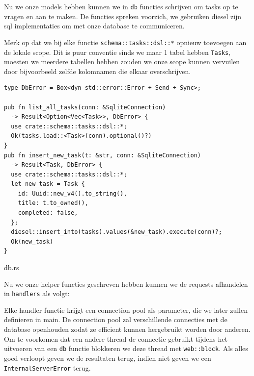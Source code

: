 Nu we onze models hebben kunnen we in \texttt{db} functies schrijven om tasks op te vragen
en aan te maken. De functies spreken voorzich, we gebruiken diesel zijn sql implementaties om met
onze database te communiceren.

Merk op dat we bij elke functie \texttt{schema::tasks::dsl::*} opnieuw toevoegen aan de
lokale scope. Dit is puur conventie sinds we maar 1 tabel hebben \texttt{Tasks}, moesten
we meerdere tabellen hebben zouden we onze scope kunnen vervuilen door bijvoorbeeld zelfde
kolomnamen die elkaar overschrijven.

\begin{listing}[h]
\begin{verbatim}
type DbError = Box<dyn std::error::Error + Send + Sync>;

pub fn list_all_tasks(conn: &SqliteConnection) 
  -> Result<Option<Vec<Task>>, DbError> {
  use crate::schema::tasks::dsl::*;
  Ok(tasks.load::<Task>(conn).optional()?)
}
pub fn insert_new_task(t: &str, conn: &SqliteConnection) 
  -> Result<Task, DbError> {
  use crate::schema::tasks::dsl::*;
  let new_task = Task {
    id: Uuid::new_v4().to_string(),
    title: t.to_owned(),
    completed: false,
  };
  diesel::insert_into(tasks).values(&new_task).execute(conn)?;
  Ok(new_task)
}
\end{verbatim}
\caption{db.rs}
\end{listing}

\clearpage

Nu we onze helper functies geschreven hebben kunnen we de requests afhandelen in
\texttt{handlers} als volgt:

Elke handler functie krijgt een connection pool als parameter, die we later zullen definieren in
main. De connection pool zal verschillende connecties met de database openhouden zodat ze efficient
kunnen hergebruikt worden door anderen. Om te voorkomen dat een andere thread de connectie gebruikt
tijdens het uitvoeren van een \texttt{db} functie blokkeren we deze thread met
\texttt{web::block}. Als alles goed verloopt geven we de resultaten terug, indien niet
geven we een \texttt{InternalServerError} terug.

